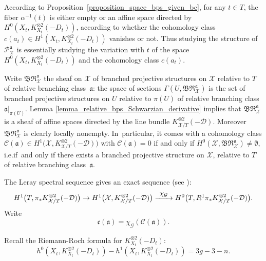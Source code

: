 \documentclass[10pt]{amsart}
\newcommand{\ie}{i.e.}
\newcommand\To[1]{\mathchoice{\xrightarrow{\textstyle\kern4pt#1\kern3pt}}{\stackrel{#1}{\longrightarrow}}{}{}}
\theoremstyle{definition}
\theoremstyle{plain}
\begin{document}
According to Proposition~\ref{proposition_space_bps_given_bc}, for any $t \in T$, the fiber $\alpha^{-1}(t)$ is either empty or an affine space directed by $H^0\left(X_t, K_{X_t}^{\otimes 2}(-D_t)\right)$, according to whether the cohomology class $c(a_t) \in H^1\left(X_t, K_{X_t}^{\otimes 2}(-D_t)\right)$ vanishes or not.
Thus studying the structure of $\mathcal P_{\mathcal X}^{\mathfrak a}$ is essentially studying the variation with $t$ of the space $H^0\left(X_t, K_{X_t}^{\otimes 2}(-D_t)\right)$ and the cohomology class $c(a_t)$.

Write $\mathfrak{BR}_{\mathcal X}^{\mathfrak a}$ the sheaf on $\mathcal X$ of branched projective structures on $\mathcal X$ relative to $T$ of relative branching class~$\mathfrak a$: the space of sections $\Gamma\left(U, \mathfrak{BR}_{\mathcal X}^{\mathfrak a}\right)$ is the set of branched projective structures on $U$ relative to $\pi(U)$ of relative branching class $\mathfrak a|_{\pi(U)}$.
Lemma \ref{lemma_relative_bps_Schwarzian_derivative} implies that $\mathfrak{BR}_{\mathcal X}^{\mathfrak a}$ is a sheaf of affine spaces directed by the line bundle $K_{\mathcal X/T}^{\otimes 2}(-\mathcal D)$.
Moreover $\mathfrak{BR}_{\mathcal X}^{\mathfrak a}$ is clearly locally nonempty. In~particular, it comes with a cohomology class $\mathcal C(\mathfrak a) \in H^1\bigl(\mathcal X, K_{\mathcal X/T}^{\otimes 2}(-\mathcal D)\bigr)$ with $\mathcal C(\mathfrak a) = 0$ if and only if $H^0(\mathcal X, \mathfrak{BR}_{\mathcal X}^{\mathfrak a}) \neq \emptyset$, \ie if~and only if there exists a branched projective structure on $\mathcal X$, relative to $T$ of relative branching class~$\mathfrak a$.

The Leray spectral sequence gives an exact sequence (see \cite{voisin_en_I}):\vspace*{-3pt}
\begin{equation}\label{eq_leray_exact_sequence}
H^1\bigl(T, \pi_*K_{\mathcal X/T}^{\otimes 2}(-\mathcal D)\bigr) \to H^1\bigl(\mathcal X, K_{\mathcal X/T}^{\otimes 2}(-\mathcal D)\bigr) \To{\chi_{\mathcal G}} H^0\bigl(T, R^1\pi_*K_{\mathcal X/T}^{\otimes 2}(-\mathcal D)\bigr).
\end{equation}
Write\vspace*{-3pt}
\begin{equation}\label{eq_section_obstruction}
\mathfrak c(\mathfrak a) = \chi_{\mathcal G}(\mathcal C(\mathfrak a)).
\end{equation}

Recall the Riemann-Roch formula for $K_{X_t}^{\otimes 2}(-D_t)$:\vspace*{-3pt}
\begin{equation*}
h^0\left(X_t, K_{X_t}^{\otimes 2}(-D_t)\right) - h^1\left(X_t, K_{X_t}^{\otimes 2}(-D_t)\right) = 3g-3-n.
\end{equation*}
\end{document}
